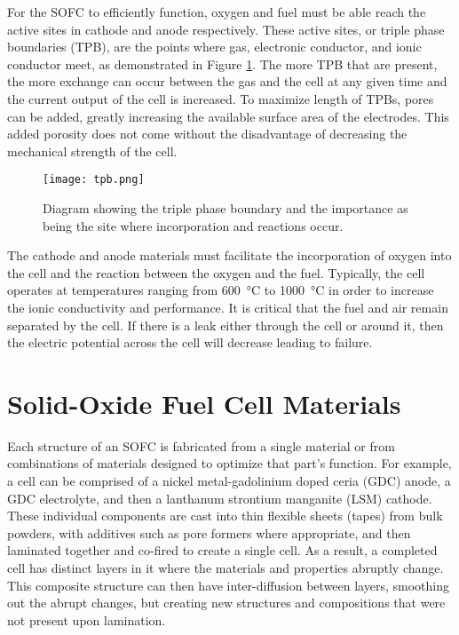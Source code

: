 For the SOFC to efficiently function, oxygen and fuel must be able reach the active sites in cathode and anode respectively.
These active sites, or triple phase boundaries (TPB), are the points where gas, electronic conductor, and ionic conductor meet, as demonstrated in Figure \ref{fig:tpb}.
The more TPB that are present, the more exchange can occur between the gas and the cell at any given time and the current output of the cell is increased.
To maximize length of TPBs, pores can be added, greatly increasing the available surface area of the electrodes.
This added porosity does not come without the disadvantage of decreasing the mechanical strength of the cell.\cite{Pihlatie2009,Laurencin2010}
\begin{figure}
  \centering
  \texttt{[image: tpb.png]}
  \caption[Diagram showing the triple phase boundary and the importance as being the site where incorporation and reactions occur.]{Diagram showing the triple phase boundary and the importance as being the site where incorporation and reactions occur.\cite{Wachsman2011a}}\label{fig:tpb}
\end{figure}

The cathode and anode materials must facilitate the incorporation of oxygen into the cell and the reaction between the oxygen and the fuel.
Typically, the cell operates at temperatures ranging from \SI{600}{\celsius} to \SI{1000}{\celsius} in order to increase the ionic conductivity and performance.
It is critical that the fuel and air remain separated by the cell.
If there is a leak either through the cell or around it, then the electric potential across the cell will decrease leading to failure.


\section{Solid-Oxide Fuel Cell Materials}

Each structure of an SOFC is fabricated from a single material or from combinations of materials designed to optimize that part's function.
For example, a cell can be comprised of a nickel metal-gadolinium doped ceria (GDC) anode, a GDC electrolyte, and then a lanthanum strontium manganite (LSM) cathode.\cite{Liu2002,Haile2003}
These individual components are cast into thin flexible sheets (tapes) from bulk powders, with additives such as pore formers where appropriate, and then laminated together and co-fired to create a single cell.
As a result, a completed cell has distinct layers in it where the materials and properties abruptly change.
This composite structure can then have inter-diffusion between layers, smoothing out the abrupt changes, but creating new structures and compositions that were not present upon lamination.\cite{Yokokawa2008}

